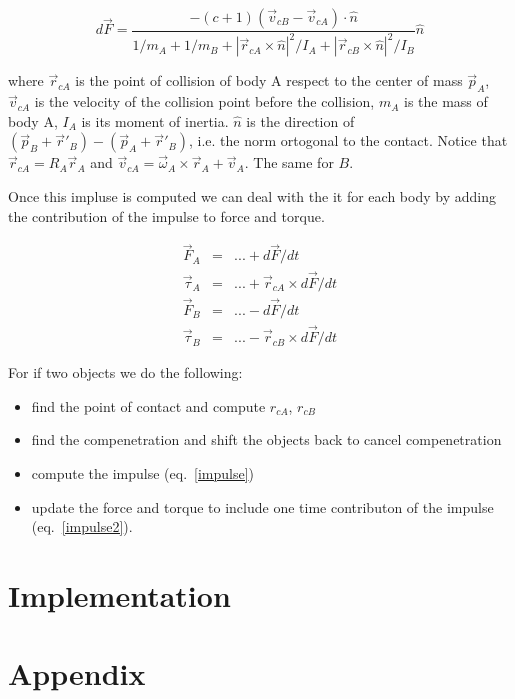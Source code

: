 \documentclass[12pt]{article}
\begin{document}
\begin{equation}
d{\vec F} = \frac {-(c+1) (\vec v_{cB} - \vec v_{cA}) \cdot \hat n}{1/m_A+1/m_B + |\vec r_{cA} \times \hat n|^2 / I_A + |\vec r_{cB} \times \hat n|^2 / I_B}\hat n
\label{impulse}
\end{equation}

where $\vec r_{cA}$ is the point of collision of body A respect to the center of mass $\vec p_A$, $\vec v_{cA}$ is the velocity of the collision point before the collision, $m_A$ is the mass of body A, $I_A$ is its moment of inertia. $\hat n$ is the direction of $(\vec p_B+\vec r'_B)-(\vec p_A+\vec r'_B)$, i.e. the norm ortogonal to the contact. Notice that $\vec r_{cA} = R_A\vec r_A$ and $\vec v_{cA} = \vec \omega_A \times \vec r_A + \vec v_A$. The same for $B$.

Once this impluse is computed we can deal with the it for each body by adding the contribution of the impulse to force and torque.

\begin{eqnarray}
\vec F_A &=& ... + d\vec F/dt \\
\vec \tau_A &=& ... + \vec r_{cA} \times d \vec F/dt \\
\vec F_B &=& ... - d\vec F/dt \\
\vec \tau_B &=& ... - \vec r_{cB} \times d\vec F/dt 
\label{impulse2}
\end{eqnarray}

For if two objects we do the following:
\begin{itemize}
\item find the point of contact and compute $r_{cA}$, $r_{cB}$
\item find the compenetration and shift the objects back to cancel compenetration
\item compute the impulse (eq.~\ref{impulse})
\item update the force and torque to include one time contributon of the impulse (eq.~\ref{impulse2}).
\end{itemize}

\section{Implementation}



\section{Appendix}
\end{document}
